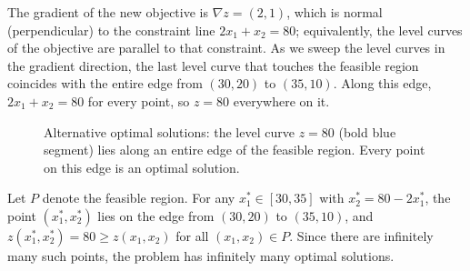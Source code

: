 \begin{solution}
The gradient of the new objective is $\nabla z = (2,1)$, which is normal (perpendicular) to the constraint line $2x_1 + x_2 = 80$; equivalently, the level curves of the objective are parallel to that constraint. As we sweep the level curves in the gradient direction, the last level curve that touches the feasible region coincides with the entire edge from $(30,20)$ to $(35,10)$.  Along this edge, $2x_1+x_2 = 80$ for every point, so $z = 80$ everywhere on it.

\begin{figure}[H]
\centering
{}
\caption{Alternative optimal solutions: the level curve $z = 80$ (bold blue segment) lies along an entire edge of the feasible region. Every point on this edge is an optimal solution.}
\label{fig:FurnitureWorkshopAltOptSoln}
\end{figure}

Let $P$ denote the feasible region. For any $x_1^* \in [30,35]$ with $x_2^* = 80 - 2x_1^*$, the point $(x_1^*,x_2^*)$ lies on the edge from $(30,20)$ to $(35,10)$, and $z(x_1^*,x_2^*) = 80 \geq z(x_1,x_2)$ for all $(x_1,x_2)\in P$. Since there are infinitely many such points, the problem has infinitely many optimal solutions.
\label{ex:FurnitureWorkshopAltOptSoln}
\end{solution}

